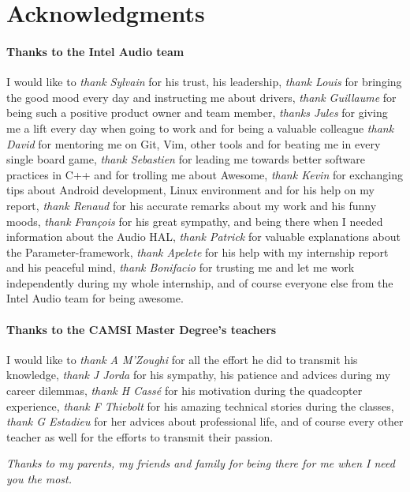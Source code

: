 \chapter*{Acknowledgments}

\subsubsection*{Thanks to the Intel Audio team}
I would like to
\emph{thank Sylvain} for his trust, his leadership,
\emph{thank Louis} for bringing the good mood every day and instructing me about drivers,
\emph{thank Guillaume} for being such a positive product owner and team member,
\emph{thanks Jules} for giving me a lift every day when going to work and for being a valuable colleague
\emph{thank David} for mentoring me on Git, Vim, other tools and for beating me in every single board game,
\emph{thank Sebastien} for leading me towards better software practices in C++ and for trolling me about Awesome,
\emph{thank Kevin} for exchanging tips about Android development, Linux environment and for his help on my report,
\emph{thank Renaud} for his accurate remarks about my work and his funny moods,
\emph{thank François} for his great sympathy, and being there when I needed information about the Audio HAL,
\emph{thank Patrick} for valuable explanations about the Parameter-framework,
\emph{thank Apelete} for his help with my internship report and his peaceful mind,
\emph{thank Bonifacio} for trusting me and let me work independently during my whole internship,
and of course everyone else from the Intel Audio team for being awesome.

\subsubsection*{Thanks to the CAMSI Master Degree's teachers}
I would like to
\emph{thank A M'Zoughi} for all the effort he did to transmit his knowledge,
\emph{thank J Jorda} for his sympathy, his patience and advices during my career dilemmas,
\emph{thank H Cassé} for his motivation during the quadcopter experience,
\emph{thank F Thiebolt} for his amazing technical stories during the classes,
\emph{thank G Estadieu} for her advices about professional life,
and of course every other teacher as well for the efforts to transmit their passion.

\vfill

\begin{minipage}{0.49\textwidth}
\begin{flushright}
\end{flushright}
\end{minipage}
\begin{minipage}{0.49\textwidth}
\begin{flushleft}
  \emph{Thanks to my parents, my friends and family for being there for me when I need you the most.}
\end{flushleft}
\end{minipage}
